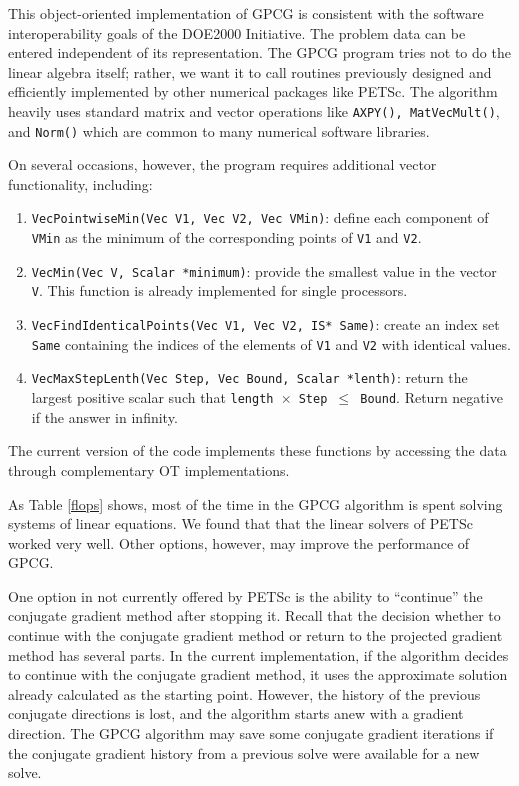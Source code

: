 This object-oriented implementation of GPCG is
consistent with the software interoperability
goals of the DOE2000 Initiative.  The problem data can be
entered independent of its representation.  The GPCG program
tries not to do the linear algebra
itself; rather, we want it to call routines previously designed and
efficiently implemented by other
numerical packages like PETSc.
The algorithm heavily uses standard matrix and vector operations like
{\tt AXPY(), MatVecMult()}, and {\tt Norm()} which are common to
many numerical software libraries.

On several occasions, however, the program requires additional vector
functionality, including:
\begin{enumerate}

\item {\tt VecPointwiseMin(Vec V1, Vec V2, Vec VMin)}: define each component
of {\tt VMin} as the minimum of the corresponding points of {\tt V1} and
{\tt V2}.

\item {\tt VecMin(Vec V, Scalar *minimum)}: provide the
smallest value in the vector {\tt V}.  This function is already implemented
for single processors.

\item {\tt VecFindIdenticalPoints(Vec V1, Vec V2, IS* Same)}: create
an index set {\tt Same}
containing the indices of the elements of {\tt V1} and {\tt V2}
with identical values.

\item {\tt VecMaxStepLenth(Vec Step, Vec Bound, Scalar *lenth)}:
return the largest positive scalar such that {\tt *length $\times$
Step $\leq$ Bound}.
Return negative if the answer in infinity.

\end{enumerate}
The current version of the code implements these functions by accessing the data
through complementary OT implementations.

As Table \ref{flops} shows, most of the time in the
GPCG algorithm is spent solving systems of linear equations.
We found that that the linear solvers of PETSc worked very well.
Other options, however, may improve the performance of GPCG.

One option in not currently offered by PETSc is the ability
to ``continue'' the conjugate gradient method after stopping it.
Recall that the decision whether to continue with
the conjugate gradient method or return to the projected gradient
method has several parts.  In the current implementation,
if the algorithm decides to continue with the conjugate gradient
method, it uses the approximate solution already calculated as
the starting point.  However, the history of
the previous conjugate directions is lost, and the algorithm
starts anew with a gradient direction.  The GPCG algorithm
may save some conjugate gradient iterations if the conjugate gradient
history from a previous solve were available for a new solve.

